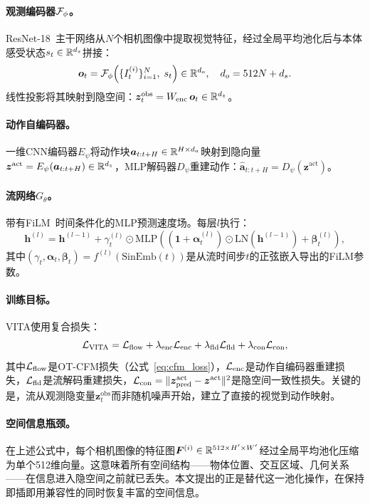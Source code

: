 \paragraph{观测编码器$\mathcal{F}_\phi$。}ResNet-18~\cite{he2016deep}主干网络从$N$个相机图像中提取视觉特征，经过全局平均池化后与本体感受状态$s_t \in \mathbb{R}^{d_s}$拼接：
\begin{equation}
    \bm{o}_t = \mathcal{F}_\phi\!\left(\{I_t^{(i)}\}_{i=1}^N,\; s_t\right) \in \mathbb{R}^{d_o}, \quad d_o = 512N + d_s.
    \label{eq:obs_encoder}
\end{equation}
线性投影将其映射到隐空间：$\bm{z}_t^{\text{obs}} = W_{\text{enc}}\, \bm{o}_t \in \mathbb{R}^{d_z}$。

\paragraph{动作自编码器。}一维CNN编码器$E_\psi$将动作块$\bm{a}_{t:t+H} \in \mathbb{R}^{H \times d_a}$映射到隐向量$\bm{z}^{\text{act}} = E_\psi(\bm{a}_{t:t+H}) \in \mathbb{R}^{d_z}$，MLP解码器$D_\psi$重建动作：$\hat{\bm{a}}_{t:t+H} = D_\psi(\bm{z}^{\text{act}})$。

\paragraph{流网络$G_\theta$。}带有FiLM~\cite{perez2018film}时间条件化的MLP预测速度场。每层$l$执行：
\begin{equation}
    \bm{h}^{(l)} = \bm{h}^{(l-1)} + \gamma_t^{(l)} \odot \text{MLP}\!\left((\bm{1} + \bm{\alpha}_t^{(l)}) \odot \text{LN}(\bm{h}^{(l-1)}) + \bm{\beta}_t^{(l)}\right),
    \label{eq:film_layer}
\end{equation}
其中$(\gamma_t, \bm{\alpha}_t, \bm{\beta}_t) = f^{(l)}(\text{SinEmb}(t))$是从流时间步$t$的正弦嵌入导出的FiLM参数。

\paragraph{训练目标。}VITA使用复合损失：
\begin{equation}
    \mathcal{L}_{\text{VITA}} = \mathcal{L}_{\text{flow}} + \lambda_{\text{enc}} \mathcal{L}_{\text{enc}} + \lambda_{\text{fld}} \mathcal{L}_{\text{fld}} + \lambda_{\text{con}} \mathcal{L}_{\text{con}},
    \label{eq:vita_loss}
\end{equation}
其中$\mathcal{L}_{\text{flow}}$是OT-CFM损失（公式~\ref{eq:cfm_loss}），$\mathcal{L}_{\text{enc}}$是动作自编码器重建损失，$\mathcal{L}_{\text{fld}}$是流解码重建损失，$\mathcal{L}_{\text{con}} = \|\bm{z}^{\text{act}}_{\text{pred}} - \bm{z}^{\text{act}}\|^2$是隐空间一致性损失。关键的是，流从观测隐变量$\bm{z}_t^{\text{obs}}$而非随机噪声开始，建立了直接的视觉到动作映射。

\paragraph{空间信息瓶颈。}在上述公式中，每个相机图像的特征图$\bm{F}^{(i)} \in \mathbb{R}^{512 \times H' \times W'}$经过全局平均池化压缩为单个512维向量。这意味着所有空间结构——物体位置、交互区域、几何关系——在信息进入隐空间之前就已丢失。本文提出的\fasa{}正是替代这一池化操作，在保持即插即用兼容性的同时恢复丰富的空间信息。
